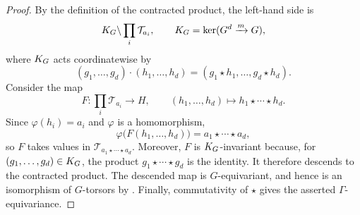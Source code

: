 \begin{proof}
By the definition of the contracted product, the left-hand side is
\[
    K_{G}\backslash\prod_i\mathcal T_{a_i},
    \qquad K_{G}=\ker(G^d\xrightarrow{m}G),
\]
where $K_{G}$ acts coordinatewise by
\[
    (g_1,\dots,g_d)\cdot(h_1,\dots,h_d)
      =(g_1\star h_1,\dots,g_d\star h_d).
\]
Consider the map
\[
    F:\prod_i\mathcal T_{a_i}\longrightarrow H,
    \qquad
    (h_1,\dots,h_d)\longmapsto h_1\star\cdots\star h_d.
\]
Since $\varphi(h_i)=a_i$ and $\varphi$ is a homomorphism,
\[
    \varphi\bigl(F(h_1,\dots,h_d)\bigr)
       =a_1\star\cdots\star a_d,
\]
so $F$ takes values in $\mathcal T_{a_1\star\cdots\star a_d}$. Moreover,
$F$ is $K_{G}$-invariant because, for $(g_1,\dots,g_d)\in K_{G}$, the product
$g_1\star\cdots\star g_d$ is the identity. It therefore descends to the
contracted product. The descended map is $G$-equivariant, and hence is an
isomorphism of $G$-torsors by . Finally,
commutativity of $\star$ gives the asserted $\Gamma$-equivariance.
\end{proof}
